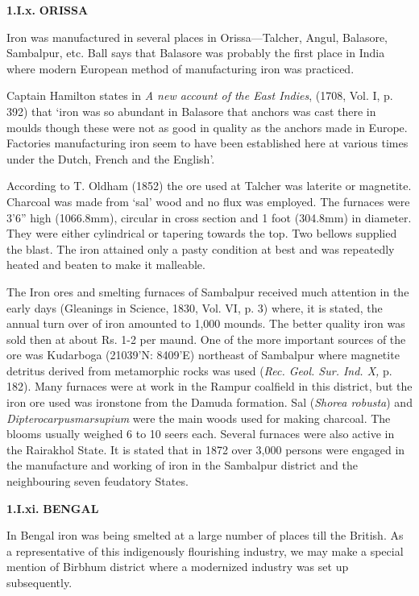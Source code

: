 \textbf{1.I.x.}\textbf{ ORISSA}

Iron was manufactured in several places in Orissa—Talcher, Angul, Balasore, Sambalpur, etc. Ball says that Balasore was probably the first place in India where modern European method of manufacturing iron was practiced.

Captain Hamilton states in \textit{A new account of the East Indies}, (1708, Vol. I, p. 392) that ‘iron was so abundant in Balasore that anchors was cast there in moulds though these were not as good in quality as the anchors made in Europe. Factories manufacturing iron seem to have been established here at various times under the Dutch, French and the English’.

According to T. Oldham (1852) the ore used at Talcher was laterite or magnetite. Charcoal was made from ‘sal’ wood and no flux was employed. The furnaces were 3'6'' high (1066.8mm), circular in cross section and 1 foot (304.8mm) in diameter. They were either cylindrical or tapering towards the top. Two bellows supplied the blast. The iron attained only a pasty condition at best and was repeatedly heated and beaten to make it malleable.

The Iron ores and smelting furnaces of Sambalpur received much attention in the early days (Gleanings in Science, 1830, Vol. VI, p. 3) where, it is stated, the annual turn over of iron amounted to 1,000 mounds. The better quality iron was sold then at about Rs. 1-2 per maund. One of the more important sources of the ore was Kudarboga (21039’N: 8409’E) northeast of Sambalpur where magnetite detritus derived from metamorphic rocks was used (\textit{Rec. Geol. Sur. Ind. X,} p. 182). Many furnaces were at work in the Rampur coalfield in this district, but the iron ore used was ironstone from the Damuda formation. Sal (\textit{Shorea robusta}) and \textit{Dipterocarpus}\textit{marsupium }were the main woods used for making charcoal. The blooms usually weighed 6 to 10 seers each. Several furnaces were also active in the Rairakhol State. It is stated that in 1872 over 3,000 persons were engaged in the manufacture and working of iron in the Sambalpur district and the neighbouring seven feudatory States.

\textbf{1.I.xi.}\textbf{ BENGAL }

In Bengal iron was being smelted at a large number of places till the British. As a representative of this indigenously flourishing industry, we may make a special mention of Birbhum district where a modernized industry was set up subsequently.

